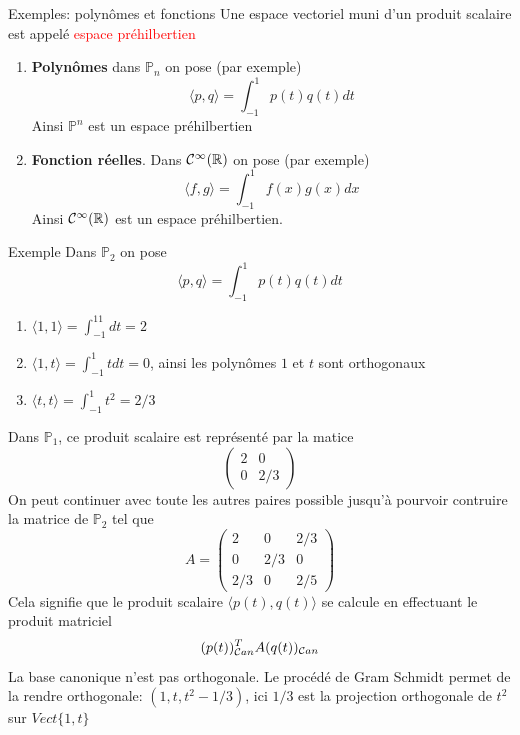         \begin{parag}{Exemples: polynômes et fonctions}
            Une espace vectoriel muni d'un produit scalaire est appelé \textcolor{red}{espace préhilbertien}
            \begin{enumerate}
                \item \textbf{Polynômes} dans $\mathbb{P}_n$ on pose (par exemple)
                \[\langle p, q \rangle = \int_{-1}^1 p(t)q(t) dt\]
                Ainsi $\mathbb{P}^n$ est un espace préhilbertien
                \item \textbf{Fonction réelles}. Dans $\mathcal{C}^\infty(\mathbb{R})$ on pose (par exemple)
                \[\langle f, g \rangle = \int_{-1}^1f(x)g(x)dx\]
                Ainsi $\mathcal{C}^\infty (\mathbb{R})$ est un espace préhilbertien.
            \end{enumerate}
            \begin{subparag}{Exemple}
                Dans $\mathbb{P}_2$ on pose
                \[\langle p, q\rangle = \int_{-1}^1 p(t)q(t)dt\]
                \begin{enumerate}
                    \item $\langle1, 1\rangle = \int_{-1}^11dt = 2$
                    \item $\langle1, t\rangle = \int_{-1}^1 tdt = 0$, ainsi les polynômes $1$ et $t$ sont orthogonaux
                    \item $\langle t, t\rangle = \int_{-1}^1t^2 = 2/3$
                \end{enumerate}
                Dans $\mathbb{P}_1$, ce produit scalaire est représenté par la matice
                \[\begin{pmatrix}
                    2 & 0 \\ 0 & 2/3
                \end{pmatrix}\]
                On peut continuer avec toute les autres paires possible jusqu'à pourvoir contruire la matrice de $\mathbb{P}_2$ tel que
                \[A = \begin{pmatrix}
                    2 & 0 & 2/3\\
                    0 & 2/3 & 0\\
                    2/3 & 0 & 2/5
                \end{pmatrix}\]
                Cela signifie que le produit scalaire $\langle p(t), q(t) \rangle$ se calcule en effectuant le produit matriciel
                \[(p(t))_{\mathcal{C} an}^T A(q(t))_{\mathcal{C} an}\]
                La base canonique n'est pas orthogonale. Le procédé de Gram Schmidt permet de la rendre orthogonale: $(1, t, t^2 - 1/3)$, ici $1/3$ est la projection orthogonale de $t^2$ sur $Vect\{1, t\}$

\end{subparag}
\end{parag}
